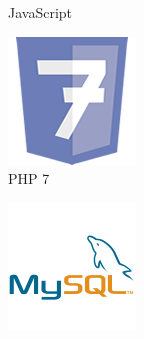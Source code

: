 \begin{figure}[H]
\begin{subfigure}[t]{0.2\linewidth}
		\caption{JavaScript}\label{fig:JavaScript}
	\end{subfigure}
    \quad
	\begin{subfigure}[t]{0.2\linewidth}
		\centering
		\includegraphics[width=\linewidth]{Images/Generic/Icons/PHP_7}
		\caption{PHP 7}\label{fig:PHP_7}
	\end{subfigure}
	\quad
	\begin{subfigure}[t]{0.2\linewidth}
		\centering
		\includegraphics[width=\linewidth]{Images/Generic/Icons/MySQL}

\end{subfigure}
\end{figure}
